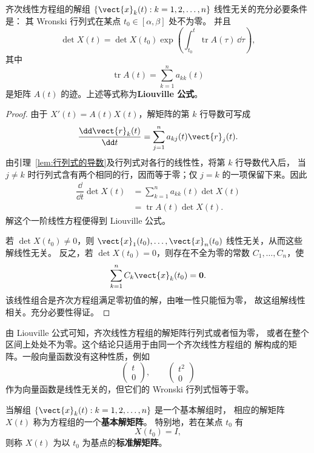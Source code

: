 \begin{theorem}\label{thm:Wronski判别与Liouville公式}
	齐次线性方程组的解组
	$\{\vect{x}_k(t):k=1,2,\ldots,n\}$ 线性无关的充分必要条件是：
	其 Wronski 行列式在某点 $t_0\in[\alpha,\beta]$ 处不为零。
	并且
	\[
		\det X(t)
		=\det X(t_0)
		\exp\left(
		\int_{t_0}^{t}\operatorname{tr}A(\tau)\,\dd\tau
		\right),
	\]
	其中
	\[
		\operatorname{tr}A(t)=\sum_{k=1}^{n}a_{kk}(t)
	\]
	是矩阵 $A(t)$ 的迹。上述等式称为\textbf{Liouville 公式}。
\end{theorem}

\begin{proof}
	由于 $X'(t)=A(t)X(t)$，解矩阵的第 $k$ 行导数可写成
	\[
		\dfrac{\dd\vect{r}_k(t)}{\dd t}
		=\sum_{j=1}^{n}a_{kj}(t)\vect{r}_j(t).
	\]
	由引理~\ref{lem:行列式的导数}及行列式对各行的线性性，将第 $k$ 行导数代入后，
	当 $j\neq k$ 时行列式含有两个相同的行，因而等于零；仅
	$j=k$ 的一项保留下来。因此
	\[
		\begin{aligned}
		\dfrac{\dd}{\dd t}\det X(t)
		&=\sum_{k=1}^{n}a_{kk}(t)\det X(t)\\
		&=\operatorname{tr}A(t)\det X(t).
		\end{aligned}
	\]
	解这个一阶线性方程便得到 Liouville 公式。

	若 $\det X(t_0)\neq 0$，则
	$\vect{x}_1(t_0),\ldots,\vect{x}_n(t_0)$ 线性无关，从而这些解线性无关。
	反之，若 $\det X(t_0)=0$，则存在不全为零的常数
	$C_1,\ldots,C_n$，使
	\[
		\sum_{k=1}^{n}C_k\vect{x}_k(t_0)=\boldsymbol{0}.
	\]
	该线性组合是齐次方程组满足零初值的解，由唯一性只能恒为零，
	故这组解线性相关。充分必要性得证。
\end{proof}

由 Liouville 公式可知，齐次线性方程组的解矩阵行列式或者恒为零，
或者在整个区间上处处不为零。这个结论只适用于由同一个齐次线性方程组的
解构成的矩阵。一般向量函数没有这种性质，例如
\[
	\begin{pmatrix}
		t\\
		0
	\end{pmatrix},
	\qquad
	\begin{pmatrix}
		t^2\\
		0
	\end{pmatrix}
\]
作为向量函数是线性无关的，但它们的 Wronski 行列式恒等于零。

\begin{definition}\label{def:基本解矩阵与标准解矩阵}
	当解组 $\{\vect{x}_k(t):k=1,2,\ldots,n\}$ 是一个基本解组时，
	相应的解矩阵 $X(t)$ 称为方程组的一个\textbf{基本解矩阵}。
	特别地，若在某点 $t_0$ 有
	\[
		X(t_0)=I,
	\]
	则称 $X(t)$ 为以 $t_0$ 为基点的\textbf{标准解矩阵}。
\end{definition}

